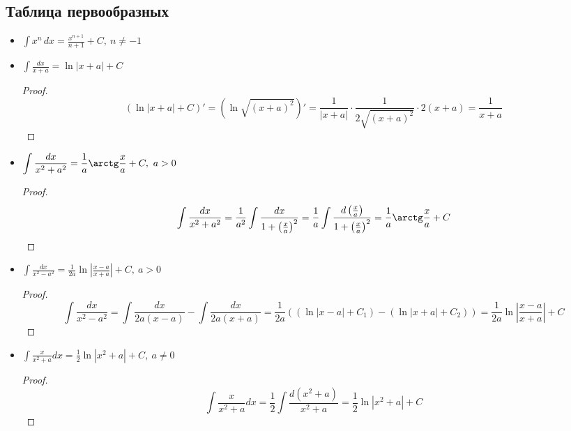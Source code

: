 \subsection{Таблица первообразных}
\begin{itemize}
	\item $\displaystyle \int x^n\,dx = \frac{x^{n+1}}{n + 1} + C, \ n \neq -1$
	
	\item $\displaystyle \int \frac{dx}{x + a} = \ln |x + a| + C$
	\begin{proof}
	\begin{equation*}
	(\ln |x + a| + C)' = (\ln \sqrt{(x + a)^2})' = \frac1{|x + a|} \cdot \frac1{2\sqrt{(x + a)^2}} \cdot 2(x + a) = \frac1{x + a}
	\end{equation*}
	\end{proof}
	
	\item $\displaystyle \int \frac{dx}{x^2 + a^2} = \frac1a \arctg \frac{x}a + C, \ a > 0$
	\begin{proof}
	\begin{equation*}
	\int \frac{dx}{x^2 + a^2} =
	\frac1{a^2} \int \frac{dx}{1 + \left( \frac{x}a \right)^2} =
	\frac1a \int \frac{d \left( \frac{x}a \right)}{1 + \left( \frac{x}a \right)^2} =
	\frac1a \arctg \frac{x}a + C
	\end{equation*}
	\end{proof}
	
	\item $\displaystyle \int \frac{dx}{x^2 - a^2} = \frac1{2a} \ln \left| \frac{x - a}{x + a} \right| + C, \ a > 0$
	\begin{proof}
	\begin{equation*}
	\int \frac{dx}{x^2 - a^2} =
	\int \frac{dx}{2a(x - a)} - \int \frac{dx}{2a(x + a)} =
	\frac1{2a} ((\ln |x - a| + C_1) - (\ln |x + a| + C_2)) =
	\frac1{2a} \ln \left| \frac{x - a}{x + a} \right| + C
	\end{equation*}
	\end{proof}
	
	\item $\displaystyle \int \frac{x}{x^2 + a} dx = \frac12 \ln |x^2 + a| + C, \ a \neq 0$
	\begin{proof}
	\begin{equation*}
	\int \frac{x}{x^2 + a} dx =
	\frac12 \int \frac{d(x^2 + a)}{x^2 + a} =
	\frac12 \ln |x^2 + a| + C
	\end{equation*}
	\end{proof}
	

\end{itemize}
